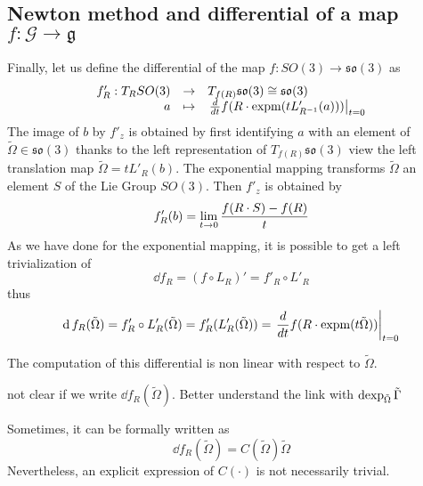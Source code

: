 \subsection{Newton method and differential of a map $f : \mathcal G \rightarrow \mathfrak g$}
Finally, let us define the differential of the map $f : SO(3) \rightarrow \mathfrak {so}(3)$ as
\begin{equation}
  \label{eq:183}
  \begin{array}[rcl]{rcl}
    f'_R : T_RSO(3) &\rightarrow&T_{f(R)}\mathfrak {so}(3) \cong  \mathfrak {so}(3)\\
           a &\mapsto& \left.\frac{d}{dt} f(R\glaw \expm(t L'_{R^{-1}}(a))) \right|_{t=0}
  \end{array}
\end{equation}
The image of $b$ by $f'_z$   is obtained by first identifying $a$ with an element of $\tilde\Omega \in \mathfrak {so}(3)$ thanks to the left representation of $T_{f(R)}\mathfrak {so}(3)$ view the left translation map $\tilde\Omega= t L'_R(b)$. The exponential mapping transforms $\tilde\Omega$ an element $S$ of the Lie Group $SO(3)$. Then $f'_z$ is obtained by
\begin{equation}
  \label{eq:184}
  f'_R(b) = \lim_{t\rightarrow 0} \frac{f(R\cdot S) - f(R)}{t}
\end{equation}
As we have done for the exponential mapping, it is possible to get a left trivialization of  
\begin{equation}
  \label{eq:185}
  \dd f_R = (f\circ L_R)' = f'_R \circ L'_R
\end{equation}
thus
\begin{equation}
  \label{eq:186}
  \operatorname{d} f_R (\tilde\Omega) =  f'_R \circ L'_R(\tilde\Omega) = f'_R(L'_R(\tilde\Omega)) =  \left.\frac{d}{dt} f(R\cdot \operatorname{expm}(t \tilde\Omega )) \right|_{t=0}
\end{equation}

\begin{ndrva}
  The computation of this differential is non linear with respect to $\tilde\Omega$.


  not clear if we write $\dd f_R (\tilde\Omega)$. Better understand the link with $\operatorname{dexp}_{\tilde \Omega}{\tilde\Gamma}$
\end{ndrva}
Sometimes, it can be formally written as
\begin{equation}
  \label{eq:180}
  \dd f_R (\tilde\Omega) = C(\tilde\Omega)\tilde\Omega 
\end{equation}
Nevertheless, an explicit expression of $C(\cdot)$ is not necessarily trivial. 

